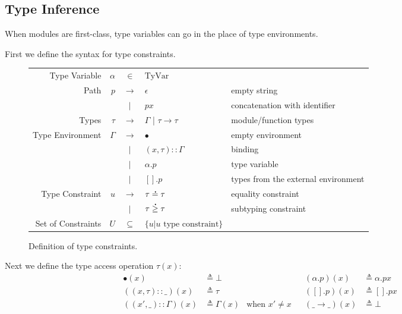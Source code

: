 \documentclass{article}
\theoremstyle{definition}
\newcommand*{\vbar}{|}
\newcommand*{\cons}{::}
\newcommand*{\A}[1]{\overset{\,_{\mbox{\Large .}}}{#1}}
\newcommand*{\TyVar}{\text{TyVar}}
\begin{document}
\subsection{Type Inference}

When modules are first-class, type variables can go in the place of type environments.

First we define the syntax for type constraints.
\begin{figure}[h!]
	\centering
	\begin{tabular}{rrcll}
		Type Variable      & $\alpha$ & $\in$         & $\TyVar$                                                               \\
		Path               & $p$      & $\rightarrow$ & $\epsilon$                       & empty string                        \\
		                   &          & $\vbar$       & $p x$                            & concatenation with identifier       \\
		Types              & $\tau$   & $\rightarrow$ & $\Gamma$ | $\tau\rightarrow\tau$ & module/function types               \\
		Type Environment   & $\Gamma$ & $\rightarrow$ & $\bullet$                        & empty environment                   \\
		                   &          & $\vbar$       & $(x,\tau)\cons \Gamma$           & binding                             \\
		                   &          & $\vbar$       & $\alpha.p$                       & type variable                       \\
		                   &          & $\vbar$       & $[].p$                           & types from the external environment \\
		Type Constraint    & $u$      & $\rightarrow$ & $\tau\A{=}\tau$                  & equality constraint                 \\
		                   &          & $\vbar$       & $\tau\A{\ge}\tau$                & subtyping constraint                \\
		Set of Constraints & $U$      & $\subseteq$   & $\{u|u\text{ type constraint}\}$
	\end{tabular}
	\caption{Definition of type constraints.}
	\label{fig:typeqdom}
\end{figure}

Next we define the type access operation $\tau(x)$:
\begin{align*}
	\bullet(x)              & \triangleq\bot      &                      &  & (\alpha.p)(x)        & \triangleq\alpha.px \\
	((x,\tau)\cons\_)(x)    & \triangleq\tau      &                      &  & ([].p)(x)            & \triangleq[].px     \\
	((x',\_)\cons\Gamma)(x) & \triangleq\Gamma(x) & \text{when }x'\neq x &  & (\_\rightarrow\_)(x) & \triangleq\bot
\end{align*}
\end{document}
